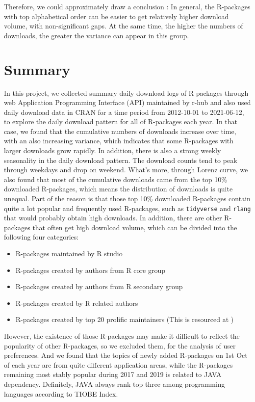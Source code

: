 \documentclass[
]{book}
\providecommand{\tightlist}{%
  \setlength{\itemsep}{0pt}\setlength{\parskip}{0pt}}
\begin{document}
Therefore, we could approximately draw a conclusion : In general, the R-packages with top alphabetical order can be easier to get relatively higher download volume, with non-significant gaps. At the same time, the higher the numbers of downloads, the greater the variance can appear in this group.

\hypertarget{summary}{%
\chapter{Summary}\label{summary}}

In this project, we collected summary daily download logs of R-packages through web Application Programming Interface (API) maintained by r-hub\autocite{rhub} and also used daily download data in CRAN for a time period from 2012-10-01 to 2021-06-12, to explore the daily download pattern for all of R-packages each year. In that case, we found that the cumulative numbers of downloads increase over time, with an also increasing variance, which indicates that some R-packages with larger downloads grow rapidly. In addition, there is also a strong weekly seasonality in the daily download pattern. The download counts tend to peak through weekdays and drop on weekend. What's more, through Lorenz curve, we also found that most of the cumulative downloads came from the top 10\% downloaded R-packages, which means the distribution of downloads is quite unequal. Part of the reason is that those top 10\% downloaded R-packages contain quite a lot popular and frequently used R-packages, such as \texttt{tidyverse} and \texttt{rlang} that would probably obtain high downloads. In addition, there are other R-packages that often get high download volume, which can be divided into the following four categories:

\begin{itemize}
\tightlist
\item
  R-packages maintained by R studio
\item
  R-packages created by authors from R core group
\item
  R-packages created by authors from R secondary group
\item
  R-packages created by R related authors
\item
  R-packages created by top 20 prolific maintainers (This is resourced at \textcite{revolutions})
\end{itemize}

However, the existence of those R-packages may make it difficult to reflect the popularity of other R-packages, so we excluded them, for the analysis of user preferences. And we found that the topics of newly added R-packages on 1st Oct of each year are from quite different application areas, while the R-packages remaining most stably popular during 2017 and 2019 is related to JAVA dependency. Definitely, JAVA always rank top three among programming languages according to TIOBE Index\autocite{tiobe}.
\end{document}
